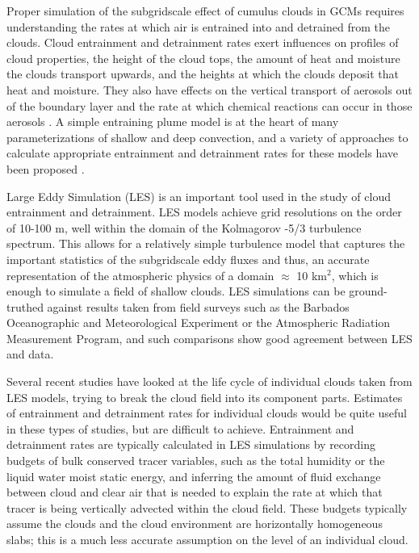\documentclass[12pt]{article}
\begin{document}
Proper simulation of the subgridscale effect of cumulus clouds in GCMs requires 
understanding the rates at which air is entrained into and detrained from the 
clouds. Cloud entrainment and detrainment rates exert influences on profiles of 
cloud properties, the height of the cloud tops, the amount of heat and moisture 
the clouds transport upwards, and the heights at which the clouds deposit that 
heat and moisture.  They also have effects on the vertical transport of 
aerosols out of the boundary layer and the rate at which chemical reactions can 
occur in those aerosols \citep{Barahona2007,Anldrejczuk2008}. A simple 
entraining plume model is at the heart of many parameterizations of shallow and 
deep convection, and a variety of approaches to calculate appropriate 
entrainment and detrainment rates for these models have been proposed
\citep{Lock2000,Bretherton2009,Siebesma2007}.

Large Eddy Simulation (LES) is an important tool used in the study of cloud 
entrainment and detrainment. LES models achieve grid resolutions on the order 
of 10-100 m, well within the domain of the Kolmagorov -5/3 turbulence spectrum. 
This allows for a relatively simple turbulence model that captures the 
important statistics of the subgridscale eddy fluxes and thus, an accurate 
representation of the atmospheric physics of a domain $\approx$ 10 km$^{2}$, 
which is enough to simulate a field of shallow clouds. LES simulations can be 
ground-truthed against results taken from field surveys such as the Barbados 
Oceanographic and Meteorological Experiment \citep[BOMEX;][]{Holland1973} or 
the Atmospheric Radiation Measurement \citep[ARM;][]{Brown2002} Program, and 
such comparisons show good agreement between LES and data.

Several recent studies have looked at the life cycle of individual clouds taken 
from LES models, trying to break the cloud field into its component parts. 
Estimates of entrainment and detrainment rates for individual clouds would be 
quite useful in these types of studies, but are difficult to achieve. 
Entrainment and detrainment rates are typically calculated in LES simulations 
by recording budgets of bulk conserved tracer variables, such as the total 
humidity or the liquid water moist static energy, and inferring the amount of
fluid exchange between cloud and clear air that is needed to explain the rate 
at which that tracer is being vertically advected within the cloud field. These 
budgets typically assume the clouds and the cloud environment are horizontally 
homogeneous slabs; this is a much less accurate assumption on the level of an 
individual cloud.
\end{document}
